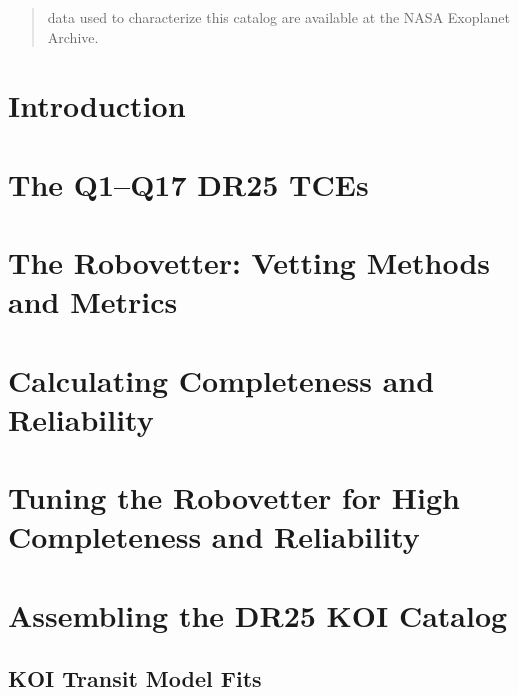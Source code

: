 \documentclass[twocolumn,tighten,trackchanges]{aastex61}
\renewcommand{\_}{\discretionary{\underscore}{}{\underscore}}  %
\begin{document}
\begin{abstract}
data used to characterize this catalog are available at the NASA Exoplanet Archive.


\end{abstract}


\section{Introduction}



\section{The Q1--Q17 DR25 TCEs}
\label{tcesec}




\section{The Robovetter: Vetting Methods and Metrics}


\section{Calculating Completeness and Reliability}


\section{Tuning the Robovetter for High Completeness and Reliability}



\section{Assembling the DR25 KOI Catalog}


\subsection{KOI Transit Model Fits}


\end{document}
